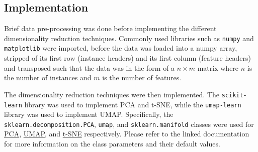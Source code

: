 \documentclass[12pt]{article}
\begin{document}

\subsection{Implementation}
Brief data pre-processing was done before implementing the different dimensionality reduction techniques. Commonly used libraries such as \verb|numpy| and \verb|matplotlib| were imported, before the data was loaded into a numpy array, stripped of its first row (instance headers) and its first column (feature headers) and transposed such that the data was in the form of a $n \times m$ matrix where $n$ is the number of instances and $m$ is the number of features.

The dimensionality reduction techniques were then implemented. The \verb|scikit-learn| library was used to implement PCA and t-SNE, while the \verb|umap-learn| library was used to implement UMAP. Specifically, the \verb|sklearn.decomposition.PCA|, \verb|umap|, and \verb|sklearn.manifold| classes were used for \href{https://scikit-learn.org/stable/modules/generated/sklearn.decomposition.PCA.html}{PCA}, \href{https://umap-learn.readthedocs.io/en/latest/parameters.html}{UMAP}, and \href{https://scikit-learn.org/stable/modules/generated/sklearn.manifold.TSNE.html}{t-SNE} respectively. Please refer to the linked documentation for more information on the class parameters and their default values.
\end{document}
